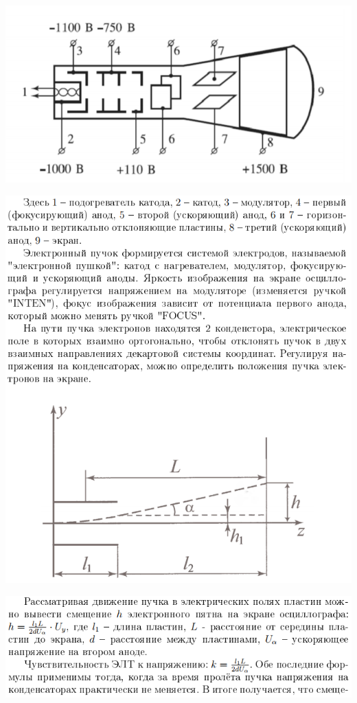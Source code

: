 \documentclass[a4paper,12pt]{article} %
\begin{document}
\begin{center}
\includegraphics{2}
\end{center}
\begin{center}
\includegraphics{4}
\end{center}
\begin{center}
\includegraphics{5}
\end{center}
\end{document}
